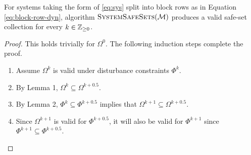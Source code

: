 \begin{lemma}
For systems taking the form of \ref{eq:sys} split into block rows as in Equation \autoref{eq:block-row-dyn}, algorithm $\Call{SystemSafeSets}{\agents}$ produces a valid safe-set collection for every $k\in\mathbb{Z}_{\geq 0}$. 
\end{lemma}
\begin{proof}
This holds trivially for $\Omega^0$. The following induction steps complete the proof.
\begin{enumerate}
	\item Assume $\Omega^k$ is valid under disturbance constraints $\Phi^k$.
	\item By Lemma 1, $\Omega^k\subseteq\Omega^{k+0.5}$.
	\item By Lemma 2, $\Phi^k\subseteq\Phi^{k+0.5}$ implies that $\Omega^{k+1}\subseteq\Omega^{k+0.5}$.
	\item Since $\Omega^{k+1}$ is valid for $\Phi^{k+0.5}$, it will also be valid for $\Phi^{k+1}$ since $\Phi^{k+1}\subseteq\Phi^{k+0.5}$.
\end{enumerate}
\end{proof}